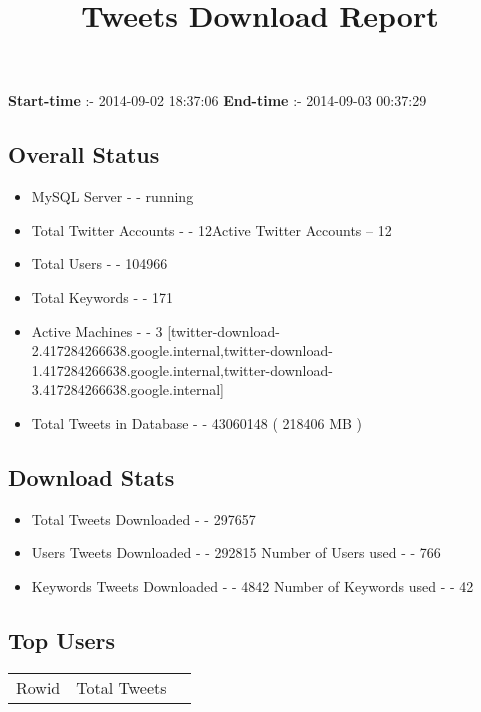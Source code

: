 \documentclass{article}\usepackage[T1]{fontenc}
\begin{document}
\title{\textbf{Tweets Download Report}}
               \date{}
                \maketitle
               \centerline{\textbf{Start-time} :- 2014-09-02 18:37:06 \hspace{40pt} \textbf{End-time} :- 2014-09-03 00:37:29}               \subsection*{Overall Status}                \begin{itemize}                \item MySQL Server - - running               \item Total Twitter Accounts - - 12\newline Active Twitter Accounts -- 12               \item Total Users - - 104966               \item Total Keywords - - 171               \item Active Machines - - 3 [twitter-download-2.417284266638.google.internal,twitter-download-1.417284266638.google.internal,twitter-download-3.417284266638.google.internal]               \item Total Tweets in Database - - 43060148 ( 218406 MB )               \end{itemize}               \subsection*{Download Stats}                \begin{itemize}                \item Total Tweets Downloaded - - 297657               \item Users Tweets Downloaded - - 292815 \newline Number of Users used - - 766               \item Keywords Tweets Downloaded - - 4842 \newline Number of Keywords used - - 42              \end{itemize}              \subsection*{Top Users}\begin{tabular}{|c|c|c|}         \hline         Rowid & Total Tweets \\ 

\end{tabular}
\end{document}
